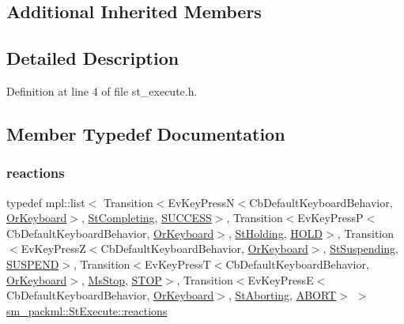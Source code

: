 \subsection*{Additional Inherited Members}


\subsection{Detailed Description}


Definition at line 4 of file st\+\_\+execute.\+h.



\subsection{Member Typedef Documentation}
\mbox{\label{structsm__packml_1_1StExecute_af118309910aebee1f998960eb0fad7a0}} 
\subsubsection{\texorpdfstring{reactions}{reactions}}
{\footnotesize\ttfamily typedef mpl\+::list$<$ Transition$<$Ev\+Key\+PressN$<$Cb\+Default\+Keyboard\+Behavior, \hyperlink{classsm__packml_1_1OrKeyboard}{Or\+Keyboard}$>$, \hyperlink{structsm__packml_1_1StCompleting}{St\+Completing}, \hyperlink{classSUCCESS}{S\+U\+C\+C\+E\+SS}$>$, Transition$<$Ev\+Key\+PressP$<$Cb\+Default\+Keyboard\+Behavior, \hyperlink{classsm__packml_1_1OrKeyboard}{Or\+Keyboard}$>$, \hyperlink{structsm__packml_1_1StHolding}{St\+Holding}, \hyperlink{structsm__packml_1_1StExecute_1_1HOLD}{H\+O\+LD}$>$, Transition$<$Ev\+Key\+PressZ$<$Cb\+Default\+Keyboard\+Behavior, \hyperlink{classsm__packml_1_1OrKeyboard}{Or\+Keyboard}$>$, \hyperlink{structsm__packml_1_1StSuspending}{St\+Suspending}, \hyperlink{structsm__packml_1_1StExecute_1_1SUSPEND}{S\+U\+S\+P\+E\+ND}$>$, Transition$<$Ev\+Key\+PressT$<$Cb\+Default\+Keyboard\+Behavior, \hyperlink{classsm__packml_1_1OrKeyboard}{Or\+Keyboard}$>$, \hyperlink{classsm__packml_1_1MsStop}{Ms\+Stop}, \hyperlink{structsm__packml_1_1StExecute_1_1STOP}{S\+T\+OP}$>$, Transition$<$Ev\+Key\+PressE$<$Cb\+Default\+Keyboard\+Behavior, \hyperlink{classsm__packml_1_1OrKeyboard}{Or\+Keyboard}$>$, \hyperlink{structsm__packml_1_1StAborting}{St\+Aborting}, \hyperlink{classABORT}{A\+B\+O\+RT}$>$ $>$ \hyperlink{structsm__packml_1_1StExecute_af118309910aebee1f998960eb0fad7a0}{sm\+\_\+packml\+::\+St\+Execute\+::reactions}}



